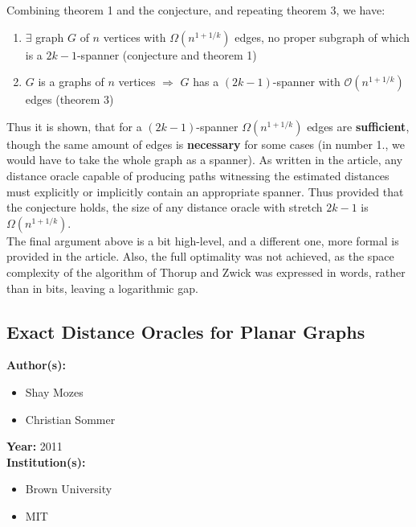 \documentclass[a4paper]{article}
\newenvironment{itemizesp}
{
    \begin{itemize}
}
{
    \end{itemize}
}
\newcommand{\textbff}[1]{{\large \textbf{#1}}}
\begin{document}
        Combining theorem 1 and the conjecture, and repeating theorem 3, we have: \\

        \begin{enumerate}
            \item $\exists$ graph $G$ of $n$ vertices with $\Omega(n^{1 + 1/k})$ edges, no proper subgraph of which is a $2k - 1$-spanner (conjecture and theorem 1)
            \item $G$ is a graphs of $n$ vertices $\Rightarrow$ $G$ has a $(2k - 1)$-spanner with $\mathcal{O}(n^{1 + 1/k})$ edges (theorem 3)
        \end{enumerate}
        {\hfill}

        Thus it is shown, that for a $(2k - 1)$-spanner $\Omega(n^{1 + 1/k})$ edges are \textbf{sufficient}, though the same amount of edges is \textbf{necessary} for some cases (in number 1., we would have to take the whole graph as a spanner). As written in the article, any distance oracle capable of producing paths witnessing the estimated distances must explicitly or implicitly contain an appropriate spanner. Thus provided that the conjecture holds, the size of any distance oracle with stretch $2k - 1$ is $\Omega(n^{1 + 1/k})$. \\

        The final argument above is a bit high-level, and a different one, more formal is provided in the article. Also, the full optimality was not achieved, as the space complexity of the algorithm of Thorup and Zwick was expressed in words, rather than in bits, leaving a logarithmic gap.
\fi

        \subsection{Exact Distance Oracles for Planar Graphs}
        \label{subsec:exactplanar}

        \textbff{Author(s): }
        \begin{itemizesp}
            \item Shay Mozes
            \item Christian Sommer
        \end{itemizesp}
        \textbff{Year: }2011 \\
        \textbff{Institution(s): }
        \begin{itemizesp}
            \item Brown University
            \item MIT
        \end{itemizesp}
\end{document}
